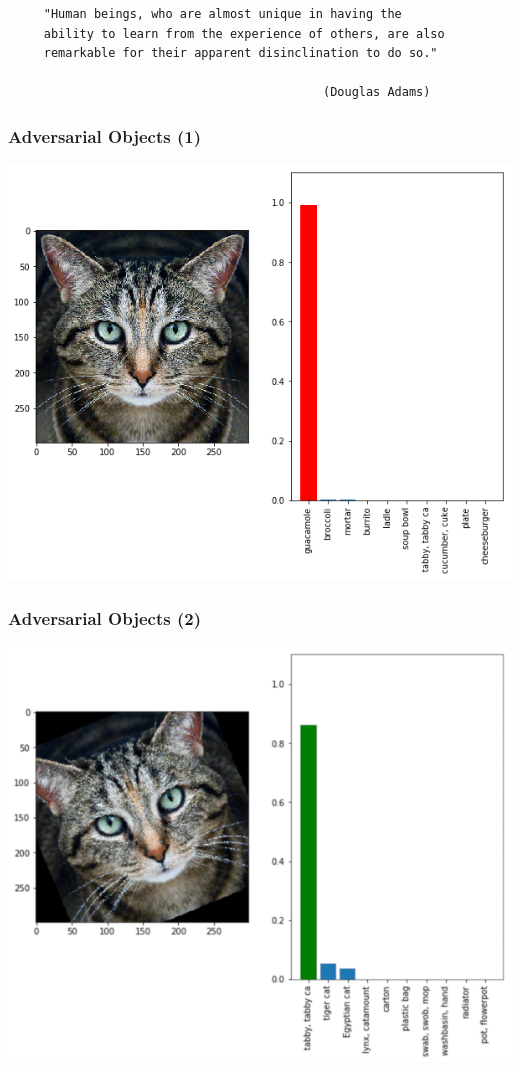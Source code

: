 \documentclass[aspectratio=169,xcolor=dvipsnames]{beamer}
\begin{document}
\begin{frame}[fragile]
\begin{verbatim}
     "Human beings, who are almost unique in having the
     ability to learn from the experience of others, are also
     remarkable for their apparent disinclination to do so."
     
                                            (Douglas Adams)
\end{verbatim}
\end{frame}

\begin{frame}
\frametitle{Adversarial Objects (1)}
\begin{center}
\includegraphics[height=0.7\paperheight,keepaspectratio]{images/cat_adversarial} 
\end{center}
\end{frame}

\begin{frame}
\frametitle{Adversarial Objects (2)}
\begin{center}
\includegraphics[height=0.7\paperheight,keepaspectratio]{images/cat_rotated} 
\end{center}
\end{frame}
\end{document}

